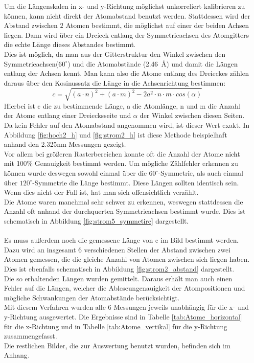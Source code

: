 \documentclass[12pt,a4paper]{article}
\begin{document}
Um die Längenskalen in x- und y-Richtung möglichst unkorreliert kalibrieren zu können, kann nicht direkt der Atomabstand benutzt werden. Stattdessen wird der Abstand zwischen 2 Atomen bestimmt, die möglichst auf einer der beiden Achsen liegen. Dann wird über ein Dreieck entlang der Symmetrieachsen des Atomgitters die echte Länge dieses Abstandes bestimmt.\\
Dies ist möglich, da man aus der Gitterstruktur den Winkel zwischen den Symmetrieachsen($60^{\circ}$) und die Atomabstände (\SI{2.46}{\angstrom}) und damit die Längen entlang der Achsen kennt. Man kann also die Atome entlang des Dreieckes zählen daraus über den Kosinussatz die Länge in die Achsenrichtung bestimmen:
\begin{equation}
c = \sqrt{(a\cdot n)^{2}+(a\cdot m)^2-2 a^{2}\cdot n\cdot m\cdot cos(\alpha)}
\end{equation}
Hierbei ist c die zu bestimmende Länge, a die Atomlänge, n und m die Anzahl der Atome entlang einer Dreiecksseite und $\alpha$ der Winkel zwischen diesen Seiten.\\Da kein Fehler auf den Atomabstand angenommen wird, ist dieser Wert exakt.
In Abbildung \ref{fig:hoch2_h} und \ref{fig:strom2_h} ist diese Methode beispielhaft anhand den 2.325nm Messungen gezeigt.\\
Vor allem bei größeren Rasterbereichen konnte oft die Anzahl der Atome nicht mit 100\% Genauigkeit bestimmt werden.
Um mögliche Zählfehler erkennen zu können wurde deswegen sowohl einmal über die  $60^{\circ}$-Symmetrie, als auch einmal über $120^{\circ}$-Symmetrie die Länge bestimmt. Diese Längen sollten identisch sein. Wenn dies nicht der Fall ist, hat man sich offensichtlich verzählt.\\
Die Atome waren manchmal sehr schwer zu erkennen, weswegen stattdessen die Anzahl oft anhand der durchquerten Symmetrieachsen bestimmt wurde. Dies ist schematisch in Abbildung \ref{fig:strom5_symmetire} dargestellt.\\
\\
Es muss außerdem noch die gemessene Länge von c im Bild bestimmt werden.\\
Dazu wird an insgesamt 6 verschiedenen Stellen der Abstand zwischen zwei Atomen gemessen, die die gleiche Anzahl von Atomen zwischen sich liegen haben.
Dies ist ebenfalls schematisch in Abbildung \ref{fig:strom2_abstand} dargestellt.\\
Die so erhaltenden Längen wurden gemittelt. Daraus erhält man auch einen Fehler auf die Längen, welcher die Ableseungenauigkeit der Atompositionen und mögliche Schwankungen der Atomabstände berücksichtigt.
\\
Mit diesem Verfahren wurden alle 6 Messungen jeweils unabhängig für die x- und y-Richtung ausgewertet. Die Ergebnisse sind in Tabelle \ref{tab:Atome_horizontal} für die x-Richtung und in Tabelle \ref{tab:Atome_vertikal} für die y-Richtung zusammengefasst.\\
Die restlichen Bilder, die zur Auswertung benutzt wurden, befinden sich im Anhang.\\
\end{document}
